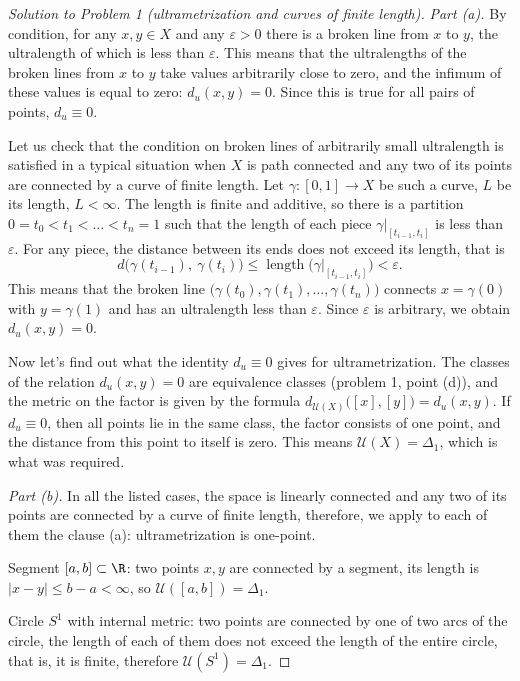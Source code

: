 \documentclass[a4paper,12pt]{report}
\begin{document}
\begin{proof}[Solution to Problem \textup{1} \textup{(}ultrametrization and curves of finite length\textup{)}]
\textit{Part \textup{(a)}.} By condition, for any $x,y\in X$ and any $\varepsilon>0$ there is a broken line from $x$ to $y$, the ultralength of which is less than $\varepsilon$. This means that the ultralengths of the broken lines from $x$ to $y$ take values arbitrarily close to zero, and the infimum of these values is equal to zero\textup{:} $d_u(x,y)=0$. Since this is true for all pairs of points, $d_u\equiv0$.

Let us check that the condition on broken lines of arbitrarily small ultralength is satisfied in a typical situation when $X$ is path connected and any two of its points are connected by a curve of finite length. Let $\gamma\colon[0,1]\to X$ be such a curve, $L$ be its length, $L<\infty$. The length is finite and additive, so there is a partition $0=t_0<t_1<\dots<t_n=1$ such that the length of each piece $\gamma|_{[t_{i-1},t_i]}$ is less than $\varepsilon$. For any piece, the distance between its ends does not exceed its length, that is
\[
d\bigl(\gamma(t_{i-1}),\ \gamma(t_i)\bigr)\le\operatorname{length}\bigl(\gamma|_{[t_{i-1},t_i]}\bigr)<\varepsilon .
\]
This means that the broken line $\bigl(\gamma(t_0),\gamma(t_1),\dots,\gamma(t_n)\bigr)$ connects $x=\gamma(0)$ with $y=\gamma(1)$ and has an ultralength less than $\varepsilon$. Since $\varepsilon$ is arbitrary, we obtain $d_u(x,y)=0$.

Now let's find out what the identity $d_u\equiv0$ gives for ultrametrization. The classes of the relation $d_u(x,y)=0$ are equivalence classes (problem \textup{1}, point \textup{(d)}), and the metric on the factor is given by the formula $d_{\mathcal U(X)}\bigl([x],[y]\bigr)=d_u(x,y)$. If $d_u\equiv0$, then all points lie in the same class, the factor consists of one point, and the distance from this point to itself is zero. This means $\mathcal U(X)=\Delta_1$, which is what was required.

\textit{Part \textup{(b)}.} In all the listed cases, the space is linearly connected and any two of its points are connected by a curve of finite length, therefore, we apply to each of them the clause \textup{(a)}\textup{:} ultrametrization is one-point.

Segment $[a,b]\subset\R$\textup{:} two points $x,y$ are connected by a segment, its length is $|x-y|\le b-a<\infty$, so $\mathcal U([a,b])=\Delta_1$.

Circle $S^1$ with internal metric\textup{:} two points are connected by one of two arcs of the circle, the length of each of them does not exceed the length of the entire circle, that is, it is finite, therefore $\mathcal U(S^1)=\Delta_1$.


\end{proof}
\end{document}
